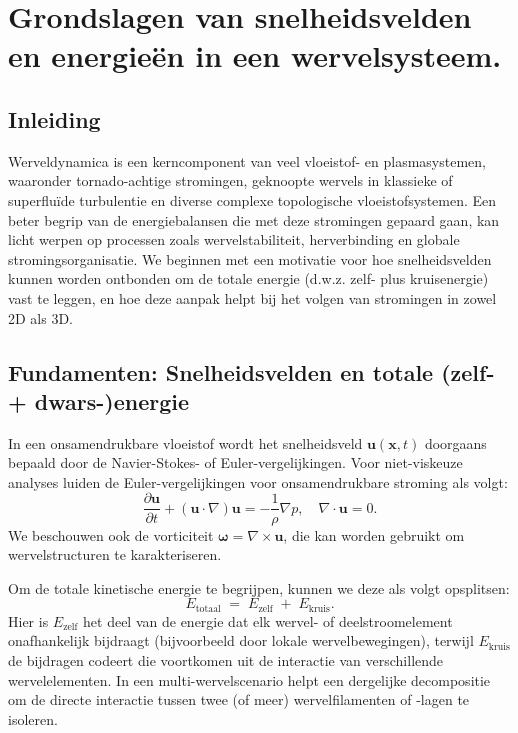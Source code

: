 \section{Grondslagen van snelheidsvelden en energieën in een wervelsysteem.}
\label{sec:appendix_7}

\subsection{Inleiding}
Werveldynamica is een kerncomponent van veel vloeistof- en plasmasystemen, waaronder
tornado-achtige stromingen, geknoopte wervels in klassieke of superfluïde turbulentie en diverse
complexe topologische vloeistofsystemen. Een beter begrip van de energiebalansen
die met deze stromingen gepaard gaan, kan licht werpen op processen zoals wervelstabiliteit, herverbinding
en globale stromingsorganisatie. We beginnen met een motivatie voor hoe snelheidsvelden kunnen worden
ontbonden om de totale energie (d.w.z. zelf- plus kruisenergie) vast te leggen, en hoe
deze aanpak helpt bij het volgen van stromingen in zowel 2D als 3D.

\subsection{Fundamenten: Snelheidsvelden en totale (zelf- + dwars-)energie}
\label{sec:foundations}
In een onsamendrukbare vloeistof wordt het snelheidsveld $\mathbf{u}(\mathbf{x}, t)$ doorgaans
bepaald door de Navier-Stokes- of Euler-vergelijkingen. Voor niet-viskeuze analyses luiden de Euler-vergelijkingen voor onsamendrukbare stroming als volgt:
\begin{equation}
\frac{\partial \mathbf{u}}{\partial t} + (\mathbf{u} \cdot \nabla)\mathbf{u} = -\frac{1}{\rho}\nabla p,
\quad \nabla \cdot \mathbf{u} = 0.\label{eq:appendix:Euler}
\end{equation}
We beschouwen ook de vorticiteit $\boldsymbol{\omega} = \nabla \times \mathbf{u}$,
die kan worden gebruikt om wervelstructuren te karakteriseren.

Om de totale kinetische energie te begrijpen, kunnen we deze als volgt opsplitsen:
\begin{equation}
E_\text{totaal} \;=\; E_\text{zelf} \;+\; E_\text{kruis}.\label{eq:appendix:totale-energie}
\end{equation}
Hier is $E_\text{zelf}$ het deel van de energie dat elk wervel- of deelstroomelement onafhankelijk bijdraagt (bijvoorbeeld door lokale wervelbewegingen), terwijl
$E_\text{kruis}$ de bijdragen codeert die voortkomen uit de interactie van verschillende
wervelelementen. In een multi-wervelscenario helpt een dergelijke decompositie om de
directe interactie tussen twee (of meer) wervelfilamenten of -lagen te isoleren.


